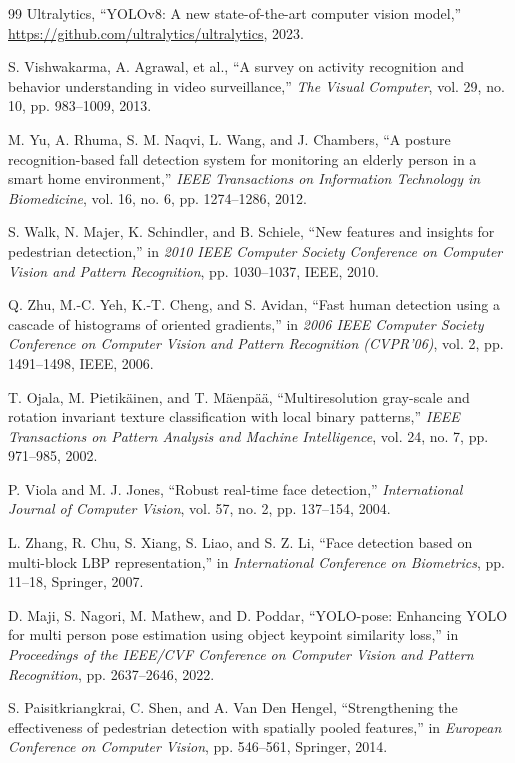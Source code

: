 \documentclass[conference]{IEEEtran}
\begin{document}
\begin{thebibliography}{99}
Ultralytics, ``YOLOv8: A new state-of-the-art computer vision model,'' \url{https://github.com/ultralytics/ultralytics}, 2023.

S. Vishwakarma, A. Agrawal, et al., ``A survey on activity recognition and behavior understanding in video surveillance,'' \textit{The Visual Computer}, vol. 29, no. 10, pp. 983--1009, 2013.

M. Yu, A. Rhuma, S. M. Naqvi, L. Wang, and J. Chambers, ``A posture recognition-based fall detection system for monitoring an elderly person in a smart home environment,'' \textit{IEEE Transactions on Information Technology in Biomedicine}, vol. 16, no. 6, pp. 1274--1286, 2012.

S. Walk, N. Majer, K. Schindler, and B. Schiele, ``New features and insights for pedestrian detection,'' in \textit{2010 IEEE Computer Society Conference on Computer Vision and Pattern Recognition}, pp. 1030--1037, IEEE, 2010.

Q. Zhu, M.-C. Yeh, K.-T. Cheng, and S. Avidan, ``Fast human detection using a cascade of histograms of oriented gradients,'' in \textit{2006 IEEE Computer Society Conference on Computer Vision and Pattern Recognition (CVPR'06)}, vol. 2, pp. 1491--1498, IEEE, 2006.

T. Ojala, M. Pietik\"ainen, and T. M\"aenp\"a\"a, ``Multiresolution gray-scale and rotation invariant texture classification with local binary patterns,'' \textit{IEEE Transactions on Pattern Analysis and Machine Intelligence}, vol. 24, no. 7, pp. 971--985, 2002.

P. Viola and M. J. Jones, ``Robust real-time face detection,'' \textit{International Journal of Computer Vision}, vol. 57, no. 2, pp. 137--154, 2004.

L. Zhang, R. Chu, S. Xiang, S. Liao, and S. Z. Li, ``Face detection based on multi-block LBP representation,'' in \textit{International Conference on Biometrics}, pp. 11--18, Springer, 2007.

D. Maji, S. Nagori, M. Mathew, and D. Poddar, ``YOLO-pose: Enhancing YOLO for multi person pose estimation using object keypoint similarity loss,'' in \textit{Proceedings of the IEEE/CVF Conference on Computer Vision and Pattern Recognition}, pp. 2637--2646, 2022.

S. Paisitkriangkrai, C. Shen, and A. Van Den Hengel, ``Strengthening the effectiveness of pedestrian detection with spatially pooled features,'' in \textit{European Conference on Computer Vision}, pp. 546--561, Springer, 2014.


\end{thebibliography}
\end{document}
